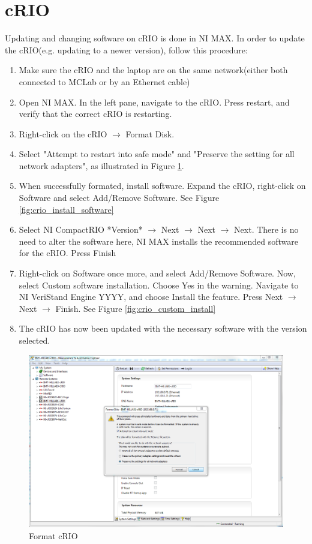 \documentclass[a4paper,english]{report}
\begin{document}
\section{cRIO}
Updating and changing software on cRIO is done in NI MAX. In order to update the cRIO(e.g. updating to a newer version), follow this procedure: 
\begin{enumerate}
	\item Make sure the cRIO and the laptop are on the same network(either both connected to MCLab or by an Ethernet cable)
	\item Open NI MAX. In the left pane, navigate to the cRIO. Press restart, and verify that the correct cRIO is restarting. 
	\item Right-click on the cRIO $\rightarrow$ Format Disk.
	\item Select "Attempt to restart into safe mode" and "Preserve the setting for all network adapters", as illustrated in Figure \ref{fig:format_crio}.
	\item When successfully formated, install software. Expand the cRIO, right-click on Software and select Add/Remove Software. See Figure \ref{fig:crio_install_software}
	\item Select NI CompactRIO *Version* $\rightarrow$ Next $\rightarrow$ Next $\rightarrow$ Next. There is no need to alter the software here, NI MAX installs the recommended software for the cRIO. Press Finish
	\item Right-click on Software once more, and select Add/Remove Software. Now, select Custom software installation. Choose Yes in the warning. Navigate to NI VeriStand Engine YYYY, and choose Install the feature. Press Next $\rightarrow$ Next $\rightarrow$ Finish. See Figure \ref{fig:crio_custom_install}
	\item The cRIO has now been updated with the necessary software with the version selected. 
\end{enumerate}
\begin{figure}[htb!]
	\centering
	\includegraphics[scale=0.4]{fig/format_crio.png}
	\caption{Format cRIO}
	\label{fig:format_crio}
\end{figure}
\end{document}
